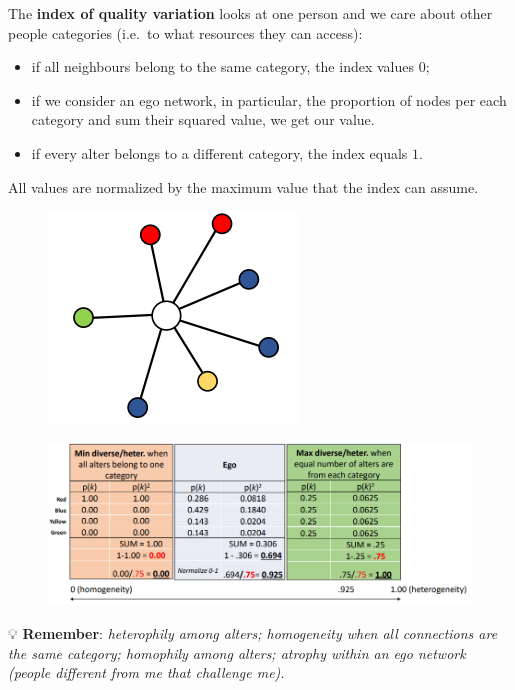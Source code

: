 \documentclass[
  notitlepage,
  onecolumn,
  openany]{book}
\providecommand{\tightlist}{%
  \setlength{\itemsep}{0pt}\setlength{\parskip}{0pt}}
\begin{document}
The \textbf{index of quality variation} looks at one person and we care about other people categories (i.e.~to what resources they can access):

\begin{itemize}
\tightlist
\item
  if all neighbours belong to the same category, the index values \(0\);
\item
  if we consider an ego network, in particular, the proportion of nodes per each category and sum their squared value, we get our value.
\item
  if every alter belongs to a different category, the index equals \(1\).
\end{itemize}

All values are normalized by the maximum value that the index can assume.

\begin{figure}[h!]

{\centering \includegraphics[width=0.3\linewidth]{images/06-Attributes based measures/Untitled 5} 

}

\end{figure}

\begin{figure}[h!]

{\centering \includegraphics[width=0.8\linewidth]{images/06-Attributes based measures/Untitled 6} 

}

\end{figure}

💡 \textbf{Remember}:
\emph{heterophily among alters;
homogeneity when all connections are the same category;
homophily among alters;
atrophy within an ego network (people different from me that challenge me).}
\end{document}
